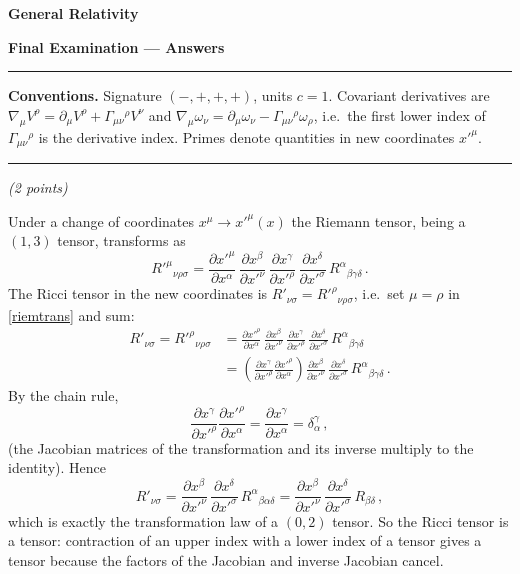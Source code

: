 \documentclass[12pt]{article}
\newcommand{\be}{\begin{equation}}
\newcommand{\ee}{\end{equation}}
\newcounter{quesno}
\newcommand{\ques}[1]{\vspace{2em}\stepcounter{quesno}
\noindent{\bf Question \thequesno.} \emph{(#1 points)}\par\medskip}
\newcommand{\pa}{\partial}
\begin{document}
\begin{center}
{\bf\Large General Relativity}

\vspace{0.5em}
{\bf\large Final Examination --- Answers}
\end{center}

\vspace{1em}
\hrule
\vspace{1em}
\noindent
\textbf{Conventions.} Signature $(-,+,+,+)$, units $c=1$. Covariant derivatives are
$\nabla_\mu V^\rho = \pa_\mu V^\rho + \Gamma_{\mu\nu}{}^\rho V^\nu$ and
$\nabla_\mu \omega_\nu = \pa_\mu\omega_\nu - \Gamma_{\mu\nu}{}^\rho\omega_\rho$, i.e.\ the
first lower index of $\Gamma_{\mu\nu}{}^\rho$ is the derivative index. Primes denote
quantities in new coordinates $x'^\mu$.
\vspace{1em}
\hrule

\ques{2}

Under a change of coordinates $x^\mu\to x'^\mu(x)$ the Riemann tensor, being a $(1,3)$ tensor,
transforms as
\be
R'^\mu{}_{\nu\rho\sigma}
= \frac{\pa x'^\mu}{\pa x^\alpha}\,
\frac{\pa x^\beta}{\pa x'^\nu}\,
\frac{\pa x^\gamma}{\pa x'^\rho}\,
\frac{\pa x^\delta}{\pa x'^\sigma}\,
R^\alpha{}_{\beta\gamma\delta}\,.
\label{riemtrans}
\ee
The Ricci tensor in the new coordinates is $R'_{\nu\sigma} = R'^\rho{}_{\nu\rho\sigma}$, i.e.\ set
$\mu=\rho$ in \eqref{riemtrans} and sum:
\begin{align}
R'_{\nu\sigma} = R'^\rho{}_{\nu\rho\sigma}
&= \frac{\pa x'^\rho}{\pa x^\alpha}\,
\frac{\pa x^\beta}{\pa x'^\nu}\,
\frac{\pa x^\gamma}{\pa x'^\rho}\,
\frac{\pa x^\delta}{\pa x'^\sigma}\,
R^\alpha{}_{\beta\gamma\delta} \nonumber\\
&= \left(\frac{\pa x^\gamma}{\pa x'^\rho}\frac{\pa x'^\rho}{\pa x^\alpha}\right)
\frac{\pa x^\beta}{\pa x'^\nu}\,
\frac{\pa x^\delta}{\pa x'^\sigma}\,
R^\alpha{}_{\beta\gamma\delta}\,.
\end{align}
By the chain rule,
\be
\frac{\pa x^\gamma}{\pa x'^\rho}\frac{\pa x'^\rho}{\pa x^\alpha} = \frac{\pa x^\gamma}{\pa x^\alpha} = \delta^\gamma_\alpha\,,
\ee
(the Jacobian matrices of the transformation and its inverse multiply to the identity). Hence
\be
R'_{\nu\sigma} = \frac{\pa x^\beta}{\pa x'^\nu}\,\frac{\pa x^\delta}{\pa x'^\sigma}\, R^\alpha{}_{\beta\alpha\delta}
= \frac{\pa x^\beta}{\pa x'^\nu}\,\frac{\pa x^\delta}{\pa x'^\sigma}\, R_{\beta\delta}\,,
\ee
which is exactly the transformation law of a $(0,2)$ tensor. So the Ricci tensor is a tensor: contraction of
an upper index with a lower index of a tensor gives a tensor because the factors of the Jacobian and inverse Jacobian
cancel.
\end{document}
